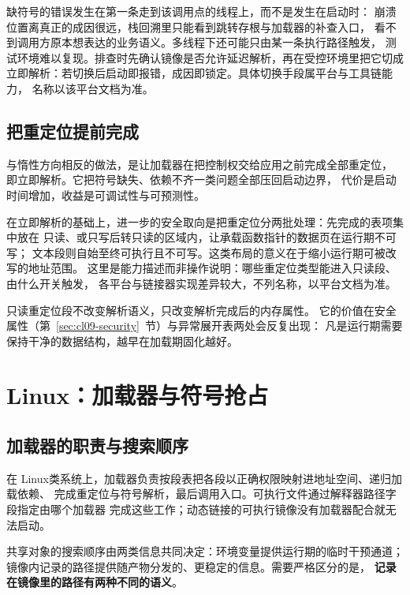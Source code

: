 \documentclass[12pt,a4paper,fontset=fandol]{ctexbook}
\newcommand{\Nix}{\textsf{Linux}}
\begin{document}
\begin{warning}[title={惰性解析给调试带来的困难}]
  缺符号的错误发生在第一条走到该调用点的线程上，而不是发生在启动时：
  崩溃位置离真正的成因很远，栈回溯里只能看到跳转存根与加载器的补查入口，
  看不到调用方原本想表达的业务语义。多线程下还可能只由某一条执行路径触发，
  测试环境难以复现。排查时先确认镜像是否允许延迟解析，再在受控环境里把它切成
  立即解析：若切换后启动即报错，成因即锁定。具体切换手段属平台与工具链能力，
  名称以该平台文档为准。
\end{warning}

\subsection{把重定位提前完成}

与惰性方向相反的做法，是让加载器在把控制权交给应用之前完成全部重定位，
即立即解析。它把符号缺失、依赖不齐一类问题全部压回启动边界，
代价是启动时间增加，收益是可调试性与可预测性。

在立即解析的基础上，进一步的安全取向是把重定位分两批处理：先完成的表项集中放在
只读、或只写后转只读的区域内，让承载函数指针的数据页在运行期不可写；
文本段则自始至终可执行且不可写。这类布局的意义在于缩小运行期可被改写的地址范围。
这里是能力描述而非操作说明：哪些重定位类型能进入只读段、由什么开关触发，
各平台与链接器实现差异较大，不列名称，以平台文档为准。

\begin{note}[title={只读重定位段的角色}]
  只读重定位段不改变解析语义，只改变解析完成后的内存属性。
  它的价值在安全属性（第~\ref{sec:cl09-security}~节）与异常展开表两处会反复出现：
  凡是运行期需要保持干净的数据结构，越早在加载期固化越好。
\end{note}

\section{\Nix：加载器与符号抢占}\label{sec:cl09-linux}

\subsection{加载器的职责与搜索顺序}

在 \Nix 类系统上，加载器负责按段表把各段以正确权限映射进地址空间、递归加载依赖、
完成重定位与符号解析，最后调用入口。可执行文件通过解释器路径字段指定由哪个加载器
完成这些工作；动态链接的可执行镜像没有加载器配合就无法启动。

共享对象的搜索顺序由两类信息共同决定：环境变量提供运行期的临时干预通道；
镜像内记录的路径提供随产物分发的、更稳定的信息。需要严格区分的是，
\textbf{记录在镜像里的路径有两种不同的语义}。
\end{document}
